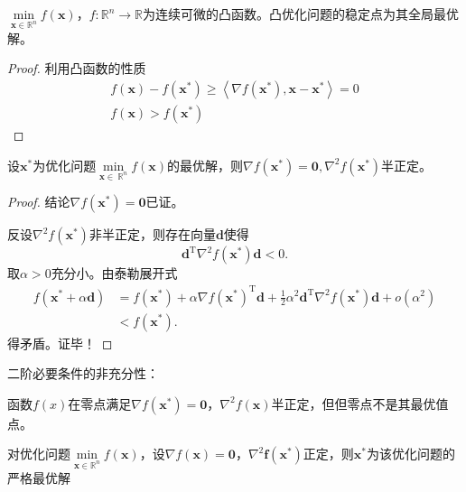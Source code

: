 \begin{theorem}[凸优化]
    $\min\limits_{\boldsymbol{x}\in\mathbb{R}^n}f(\boldsymbol{x})$，$f:\mathbb{R}^n\to \mathbb{R}$为连续可微的凸函数。凸优化问题的稳定点为其全局最优解。
\end{theorem}
\begin{proof}
    利用凸函数的性质
    \[
        \begin{array}{c}
            f(\boldsymbol{x})-f(\boldsymbol{x}^*)\geqslant \left<\nabla f(\boldsymbol{x}^*),\boldsymbol{x}-\boldsymbol{x}^*\right> = 0\\
            f(\boldsymbol{x})>f(\boldsymbol{x}^*)
        \end{array}
    \]
\end{proof}
\begin{theorem}[无约束优化二阶最优性条件]
    设$\boldsymbol{x}^*$为优化问题$\min\limits_{\boldsymbol{x}\in\
    \mathbb{R}^n}f(\boldsymbol{x})$的最优解，则$\nabla f(\boldsymbol{x}^*) = \boldsymbol{0},\nabla^2f(\boldsymbol{x}^*)$半正定。
\end{theorem}
\begin{proof}
    结论$\nabla f(\boldsymbol{x}^{*})=\mathbf{0}$已证。
    
    反设$\nabla^2 f(\boldsymbol{x}^{*})$非半正定，则存在向量$\boldsymbol{d}$使得
    \[
        \boldsymbol{d}^\mathrm{T}\nabla^2f(\boldsymbol{x^*})\boldsymbol{d}<0.
    \]
    取$\alpha>0$充分小。由泰勒展开式
    \[
        \begin{array}{ll}
            f(\boldsymbol{x}^{*}+\alpha\boldsymbol{d})& =f(\boldsymbol{x}^{*})+\alpha\nabla f(\boldsymbol{x}^{*})^{\mathrm{T}}\boldsymbol{d}+\frac{1}{2}\alpha^{2}\boldsymbol{d}^{\mathrm{T}}\nabla^{2}f(\boldsymbol{x}^{*})\boldsymbol{d}+o(\alpha^{2})  \\
            &<f(\boldsymbol{x}^{*}).
        \end{array}
    \]
    得矛盾。证毕！
\end{proof}
\begin{note}
    二阶必要条件的非充分性：
    
    函数$f(x)$在零点满足$\nabla f(\boldsymbol{x}^*) = \boldsymbol{0}$，$\nabla^2f(\boldsymbol{x})$半正定，但但零点不是其最优值点。
\end{note}
\begin{theorem}[二阶充分条件]
    对优化问题$\min\limits_{\boldsymbol{x}\in \mathbb{R}^n}f(\boldsymbol{x})$，设$\nabla f(\boldsymbol{x}) = \boldsymbol{0}$，$\nabla^2\boldsymbol{f(\boldsymbol{x}^*)}$正定，则$\boldsymbol{x}^*$为该优化问题的严格最优解
\end{theorem}
